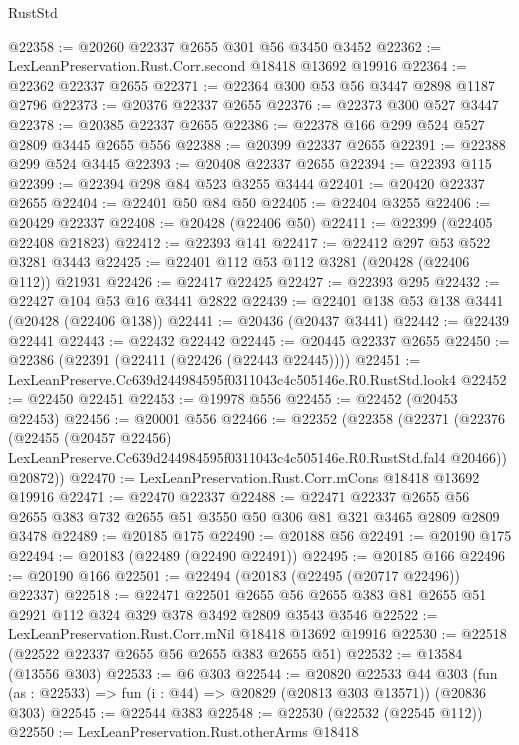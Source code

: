 \begin{lexlean}{RustStd}
\begin{coremodule}
@22358 := @20260 @22337 @2655 @301 @56 @3450 @3452
@22362 := LexLeanPreservation.Rust.Corr.second @18418 @13692 @19916
@22364 := @22362 @22337 @2655
@22371 := @22364 @300 @53 @56 @3447 @2898 @1187 @2796
@22373 := @20376 @22337 @2655
@22376 := @22373 @300 @527 @3447
@22378 := @20385 @22337 @2655
@22386 := @22378 @166 @299 @524 @527 @2809 @3445 @2655 @556
@22388 := @20399 @22337 @2655
@22391 := @22388 @299 @524 @3445
@22393 := @20408 @22337 @2655
@22394 := @22393 @115
@22399 := @22394 @298 @84 @523 @3255 @3444
@22401 := @20420 @22337 @2655
@22404 := @22401 @50 @84 @50
@22405 := @22404 @3255
@22406 := @20429 @22337
@22408 := @20428 (@22406 @50)
@22411 := @22399 (@22405 @22408 @21823)
@22412 := @22393 @141
@22417 := @22412 @297 @53 @522 @3281 @3443
@22425 := @22401 @112 @53 @112 @3281 (@20428 (@22406 @112)) @21931
@22426 := @22417 @22425
@22427 := @22393 @295
@22432 := @22427 @104 @53 @16 @3441 @2822
@22439 := @22401 @138 @53 @138 @3441 (@20428 (@22406 @138))
@22441 := @20436 (@20437 @3441)
@22442 := @22439 @22441
@22443 := @22432 @22442
@22445 := @20445 @22337 @2655
@22450 := @22386 (@22391 (@22411 (@22426 (@22443 @22445))))
@22451 := LexLeanPreserve.Cc639d244984595f0311043c4c505146e.R0.RustStd.look4
@22452 := @22450 @22451
@22453 := @19978 @556
@22455 := @22452 (@20453 @22453)
@22456 := @20001 @556
@22466 := @22352
    (@22358
      (@22371
        (@22376
          (@22455
            (@20457 @22456)
            LexLeanPreserve.Cc639d244984595f0311043c4c505146e.R0.RustStd.fal4
            @20466))
        @20872))
@22470 := LexLeanPreservation.Rust.Corr.mCons @18418 @13692 @19916
@22471 := @22470 @22337
@22488 := @22471
    @22337
    @2655
    @56
    @2655
    @383
    @732
    @2655
    @51
    @3550
    @50
    @306
    @81
    @321
    @3465
    @2809
    @2809
    @3478
@22489 := @20185 @175
@22490 := @20188 @56
@22491 := @20190 @175
@22494 := @20183 (@22489 (@22490 @22491))
@22495 := @20185 @166
@22496 := @20190 @166
@22501 := @22494 (@20183 (@22495 (@20717 @22496)) @22337)
@22518 := @22471
    @22501
    @2655
    @56
    @2655
    @383
    @81
    @2655
    @51
    @2921
    @112
    @324
    @329
    @378
    @3492
    @2809
    @3543
    @3546
@22522 := LexLeanPreservation.Rust.Corr.mNil @18418 @13692 @19916
@22530 := @22518 (@22522 @22337 @2655 @56 @2655 @383 @2655 @51)
@22532 := @13584 (@13556 @303)
@22533 := @6 @303
@22544 := @20820
    @22533
    @44
    @303
    (fun (as : @22533) => fun (i : @44) => @20829 (@20813 @303 @13571))
    (@20836 @303)
@22545 := @22544 @383
@22548 := @22530 (@22532 (@22545 @112))
@22550 := LexLeanPreservation.Rust.otherArms @18418

\end{coremodule}
\end{lexlean}
